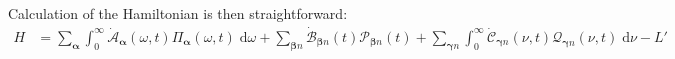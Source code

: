 \documentclass{article}
\begin{document}
Calculation of the Hamiltonian is then straightforward:
\begin{equation}
\begin{split}
H &= \sum_{\bm{\alpha}}\int_0^\infty\dot{\mathcal{A}}_{\bm{\alpha}}(\omega,t)\mathit{\Pi}_{\bm{\alpha}}(\omega,t)\;\mathrm{d}\omega + \sum_{\bm{\beta}n}\dot{\mathcal{B}}_{\bm{\beta}n}(t)\mathcal{P}_{\bm{\beta}n}(t) + \sum_{\bm{\gamma}n}\int_0^\infty\dot{\mathcal{C}}_{\bm{\gamma}n}(\nu,t)\mathcal{Q}_{\bm{\gamma}n}(\nu,t)\;\mathrm{d}\nu - L'\\

\end{split}
\end{equation}
\end{document}
